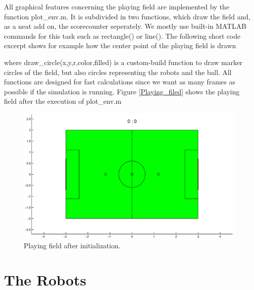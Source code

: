 All graphical features concerning the playing field are implemented by the function {\selectfont plot\_env.m}. It is subdivided in two functions, which draw the field and, as a neat add on, the scorecounter seperately. We mostly use built-in MATLAB commands for this task such as {\selectfont rectangle()} or {\selectfont line()}. The following short code excerpt shows for example how the center point of the playing field is drawn


\parskip 20pt

where {\selectfont draw\_circle(x,y,r,color,filled)} is a custom-build function to draw marker circles of the field, but also circles representing the robots and the ball. All functions are designed for fast calculations since we want as many frames as possible if the simulation is running. Figure \ref{Playing_filed} shows the playing field after the execution of {\selectfont plot\_env.m}
\parskip 10pt

\begin{figure}[htbp]
	\centering
    	\includegraphics[width=12cm]{./2_Simulation/playing_field}
  	\caption{Playing field after initialization.}
  	\label{Playing_field}
\end{figure}


\section{The Robots}

